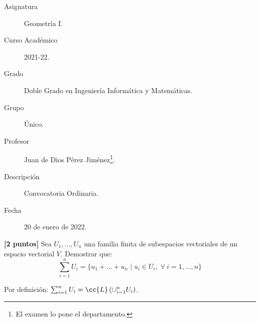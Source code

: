 \documentclass[12pt]{article}
\begin{document}

    
    

    \begin{description}
        \item[Asignatura] Geometría I.
        \item[Curso Académico] 2021-22.
        \item[Grado] Doble Grado en Ingeniería Informática y Matemáticas.
        \item[Grupo] Único.
        \item[Profesor] Juan de Dios Pérez Jiménez\footnote{El examen lo pone el departamento.}.
        \item[Descripción] Convocatoria Ordinaria.
        \item[Fecha] 20 de enero de 2022.
    
    \end{description}
    \newpage

\begin{ejercicio}\textbf{[2 puntos]} Sea $U_1,\dots,U_n$ una familia finita de subespacios vectoriales de un espacio vectorial $V$. Demostrar que:
\begin{equation*}
    \sum_{i=1}^n U_i = \{u_1 + \dots + u_n \mid u_i\in U_i,\;\forall\ i=1,\dots,n\}
\end{equation*}
\begin{observacion}
    Por definición: $\sum_{i=1}^n U_i = \cc{L}\left(\cup_{i=1}^n U_i\right)$.
\end{observacion}
\end{ejercicio}
\end{document}
